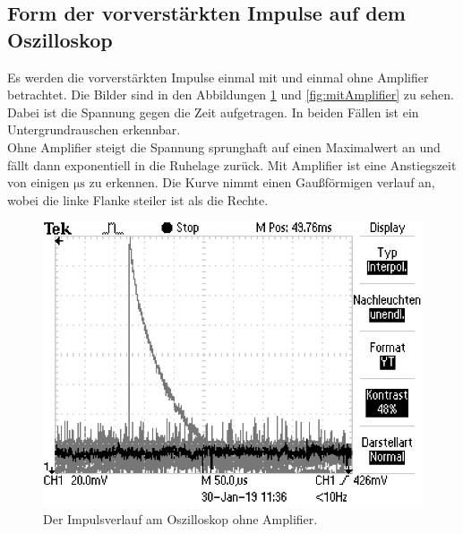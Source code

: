 \subsection{Form der vorverstärkten Impulse auf dem Oszilloskop}

Es werden die vorverstärkten Impulse einmal mit und einmal ohne Amplifier betrachtet. Die Bilder sind in den Abbildungen \ref{fig:ohneAmplifier} und \ref{fig:mitAmplifier} zu sehen. Dabei ist die Spannung gegen die Zeit aufgetragen. In beiden Fällen ist ein Untergrundrauschen erkennbar.\\
Ohne Amplifier steigt die Spannung sprunghaft auf einen Maximalwert an und fällt dann exponentiell in die Ruhelage zurück.
Mit Amplifier ist eine Anstiegszeit von einigen $\si{\micro\second}$ zu erkennen. Die Kurve nimmt einen Gaußförmigen verlauf an, wobei die linke Flanke steiler ist als die Rechte.\\

\begin{figure}
	\centering
	\includegraphics[width=\linewidth-60pt,keepaspectratio]{content/images/ohneVerstaerker02.jpg}
	\caption{Der Impulsverlauf am Oszilloskop ohne Amplifier.}
	\label{fig:ohneAmplifier}
\end{figure}

